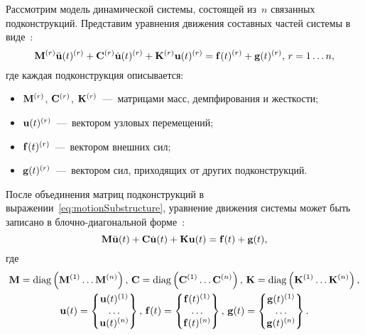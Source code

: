 Рассмотрим модель динамической системы, состоящей из~$ n $ связанных подконструкций. Представим уравнения движения составных частей системы в виде~\cite{lib:coupling:Klerk, lib:coupling:Brunetti}:
\begin{equation}
	\mathbf{M} ^ {(r)} \ddot{\mathbf{u}}(t) ^ {(r)} + \mathbf{C} ^ {(r)} \dot{\mathbf{u}}(t) ^ {(r)} + \mathbf{K} ^ {(r)} \mathbf{u}(t) ^ {(r)} = \mathbf{f}(t) ^ {(r)} + \mathbf{g}(t) ^ {(r)}, \, r = 1 \hdots n, \label{eq:motionSubstructure}
\end{equation}
где каждая подконструкция описывается:
\begin{itemize}
	\item $ \mathbf{M} ^ {(r)} $, $ \mathbf{C} ^ {(r)} $, $ \mathbf{K} ^ {(r)} $~---~матрицами масс, демпфирования и жесткости;
	\item $ \mathbf{u}(t) ^ {(r)} $~---~вектором узловых перемещений; 
	\item $ \mathbf{f}(t) ^ {(r)} $~---~вектором внешних сил; 
	\item $ \mathbf{g}(t) ^ {(r)} $~---~вектором сил, приходящих от других подконструкций. 
\end{itemize}

После объединения матриц подконструкций в выражении~\eqref{eq:motionSubstructure}, уравнение движения системы может быть записано в блочно-диагональной форме~\cite{lib:coupling:Klerk}:
\begin{equation}
	\mathbf{M} \ddot{\mathbf{u}}(t) + \mathbf{C} \dot{\mathbf{u}}(t) + \mathbf{K} \mathbf{u}(t) = \mathbf{f}(t) + \mathbf{g}(t), \label{eq:motionAssembly}
\end{equation} 
где 
\begin{equation*}
	\begin{gathered}
		\mathbf{M} = \operatorname{diag} \left( \mathbf{M} ^ {(1)} \hdots \mathbf{M} ^ {(n)} \right), \,
		\mathbf{C} = \operatorname{diag} \left( \mathbf{C} ^ {(1)} \hdots \mathbf{C} ^ {(n)} \right), \,
		\mathbf{K} = \operatorname{diag} \left( \mathbf{K} ^ {(1)} \hdots \mathbf{K} ^ {(n)} \right), \\
		\mathbf{u}(t) = 
		\begin{Bmatrix}
			\mathbf{u}(t) ^ {(1)} \\
			\hdots \\
			\mathbf{u}(t) ^ {(n)}
		\end{Bmatrix}, \,
		\mathbf{f}(t) = 
		\begin{Bmatrix}
			\mathbf{f}(t) ^ {(1)} \\
			\hdots \\
			\mathbf{f}(t) ^ {(n)}
		\end{Bmatrix}, \,
		\mathbf{g}(t) = 
		\begin{Bmatrix}
			\mathbf{g}(t) ^ {(1)} \\
			\hdots \\
			\mathbf{g}(t) ^ {(n)}
		\end{Bmatrix}.
	\end{gathered}
\end{equation*}

